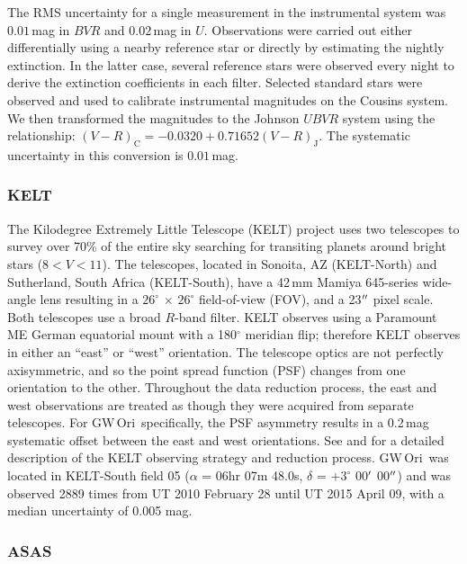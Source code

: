 \documentclass[twocolumn]{aastex61}
\newcommand{\obj}{GW\,Ori}
\begin{document}
The RMS uncertainty for a single measurement in the instrumental system was $0.01$\,mag in $BVR$ and $0.02$\,mag in $U$. Observations were carried out either differentially using a nearby reference star or directly by estimating the nightly extinction. In the latter case, several reference stars were observed every night to derive the extinction coefficients in each filter. Selected standard stars were observed and used to calibrate instrumental magnitudes on the Cousins system. We then transformed the magnitudes to the Johnson
$UBVR$ system using the relationship: $(V-R)_\mathrm{C} = -0.0320 + 0.71652(V-R)_\mathrm{J}$. The systematic uncertainty in this conversion is $0.01\,$mag. 

\subsubsection{KELT}

The Kilodegree Extremely Little Telescope (KELT) project uses two telescopes to survey over 70\% of the entire sky searching for transiting planets around bright stars ($8<V<11$). The telescopes, located in Sonoita, AZ (KELT-North) and Sutherland, South Africa (KELT-South), have a 42\,mm Mamiya 645-series wide-angle lens resulting in a $26^{\circ}$ $\times$ $26^{\circ}$ field-of-view (FOV), and a 23$\mbox{$^{\prime\prime}$}$ pixel scale. Both telescopes use a broad $R$-band filter. KELT observes using a Paramount ME German equatorial mount with a 180$^{\circ}$ meridian flip; therefore KELT observes in either an ``east'' or ``west'' orientation. The telescope optics are not perfectly axisymmetric, and so the point spread function (PSF) changes from one orientation to the other. Throughout the data reduction process, the east and west observations are treated as though they were acquired from separate telescopes. For \obj\ specifically, the PSF asymmetry results in a 0.2\,mag systematic offset between the east and west orientations. See \citet{Siverd12} and \citet{Kuhn16} for a detailed description of the KELT observing strategy and reduction process. \obj\ was located in KELT-South field 05 ($\alpha$ =  06hr 07m 48.0s, $\delta$ = $+3^{\circ}$ 00$\mbox{$^\prime$}$ 00$\mbox{$^{\prime\prime}$}$) and was observed 2889 times from UT 2010 February 28 until UT 2015 April 09, with a median uncertainty of 0.005 mag.


\subsubsection{ASAS}
\end{document}
